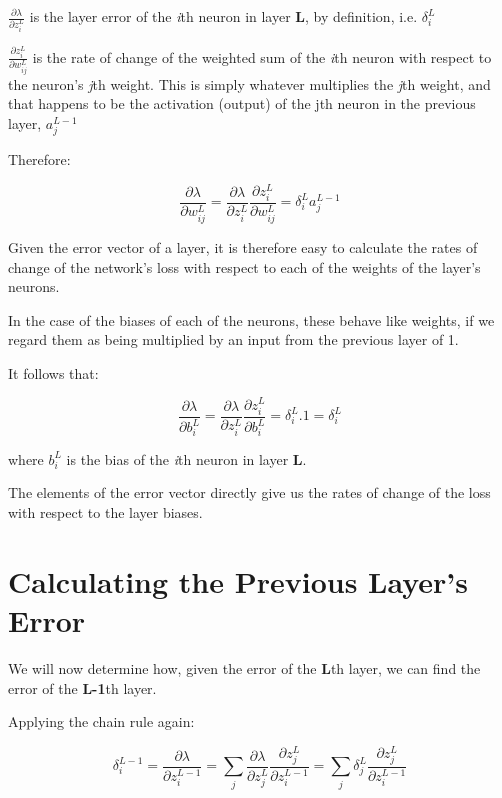 \documentclass[12pt]{article}
\begin{document}
$\frac{\partial \lambda}{\partial z^{L}_{i}}$ is the layer error of the \textit{i}th neuron in layer \textbf{L}, by definition, i.e. $\delta^{L}_{i}$

\smallskip

$\frac{\partial z^{L}_{i}}{\partial w^{L}_{ij}}$ is the rate of change of the weighted sum of the \textit{i}th neuron with respect to the neuron's \textit{j}th weight. This is simply whatever multiplies the \textit{j}th weight, and that happens to be the activation (output) of the {j}th neuron in the previous layer, $a^{L-1}_{j}$

Therefore:

\begin{equation} \label{eq:3}
\frac{\partial \lambda}{\partial w^{L}_{ij}}=\frac{\partial \lambda}{\partial z^{L}_{i}}
\frac{\partial z^{L}_{i}}{\partial w^{L}_{ij}}
=
\delta^{L}_{i} a^{L-1}_{j}
\end{equation}

Given the error vector of a layer, it is therefore easy to calculate the rates of change of the network's loss with respect to each of the weights of the layer's neurons.

In the case of the biases of each of the neurons, these behave like weights, if we regard them as being multiplied by an input from the previous layer of 1.

It follows that:

\begin{equation} \label{eq:4}
\frac{\partial \lambda}{\partial b^{L}_{i}}=\frac{\partial \lambda}{\partial z^{L}_{i}}
\frac{\partial z^{L}_{i}}{\partial b^{L}_{i}}
=
\delta^{L}_{i}. 1 =
\delta^{L}_{i}
\end{equation}

where $b^{L}_i$ is the bias of the \textit{i}th neuron in layer \textbf{L}.

The elements of the error vector directly give us the rates of change of the loss with respect to the layer biases.

\section{Calculating the Previous Layer's Error}

We will now determine how, given the error of the \textbf{L}th layer, we can find the error of the \textbf{L-1}th layer.

Applying the chain rule again:

\begin{equation} \label{eq:5}
\delta^{L-1}_{i}=\frac{\partial \lambda}{\partial z^{L-1}_i} = \sum_{j} \frac{\partial \lambda}{\partial z^{L}_j} \frac{\partial z^{L}_j}{\partial z^{L-1}_i}
=
\sum_{j} \delta^{L}_{j}\frac{\partial z^{L}_j}{\partial z^{L-1}_i}
\end{equation}
\end{document}
